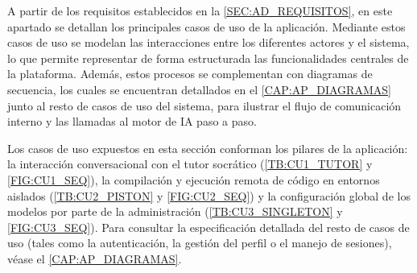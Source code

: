 A partir de los requisitos establecidos en la \autoref{SEC:AD_REQUISITOS}, en este apartado se detallan los principales casos de uso de la aplicación. Mediante estos casos de uso se modelan las interacciones entre los diferentes actores y el sistema, lo que permite representar de forma estructurada las funcionalidades centrales de la plataforma. Además, estos procesos se complementan con diagramas de secuencia, los cuales se encuentran detallados en el \autoref{CAP:AP_DIAGRAMAS} junto al resto de casos de uso del sistema, para ilustrar el flujo de comunicación interno y las llamadas al motor de IA paso a paso.

Los casos de uso expuestos en esta sección conforman los pilares de la aplicación: la interacción conversacional con el tutor socrático (\autoref{TB:CU1_TUTOR} y \autoref{FIG:CU1_SEQ}), la compilación y ejecución remota de código en entornos aislados (\autoref{TB:CU2_PISTON} y \autoref{FIG:CU2_SEQ}) y la configuración global de los modelos por parte de la administración (\autoref{TB:CU3_SINGLETON} y \autoref{FIG:CU3_SEQ}). Para consultar la especificación detallada del resto de casos de uso (tales como la autenticación, la gestión del perfil o el manejo de sesiones), véase el \autoref{CAP:AP_DIAGRAMAS}.

\vspace{0.5cm}

